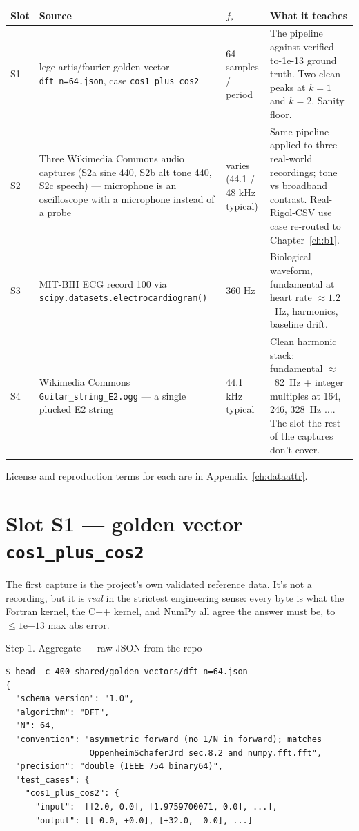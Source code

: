 \documentclass[11pt,a4paper,openany]{book}
\begin{document}
\begin{longtable}{p{2.2cm}p{4.0cm}p{2.0cm}p{6.0cm}}
\toprule
\textbf{Slot} & \textbf{Source} & \textbf{$f_s$} & \textbf{What it teaches} \\
\midrule
\endhead
S1 & lege-artis/fourier golden vector \texttt{dft\_n=64.json}, case \texttt{cos1\_plus\_cos2} & 64 samples / period & The pipeline against verified-to-1e-13 ground truth. Two clean peaks at $k=1$ and $k=2$. Sanity floor. \\
S2 & Three Wikimedia Commons audio captures (S2a sine 440, S2b alt tone 440, S2c speech) --- microphone is an oscilloscope with a microphone instead of a probe & varies (44.1 / 48 kHz typical) & Same pipeline applied to three real-world recordings; tone vs broadband contrast. Real-Rigol-CSV use case re-routed to Chapter~\ref{ch:b1}. \\
S3 & MIT-BIH ECG record 100 via \texttt{scipy.datasets.electrocardiogram()} \cite{Moody2001,Goldberger2000} & 360 Hz & Biological waveform, fundamental at heart rate $\approx 1.2$~Hz, harmonics, baseline drift. \\
S4 & Wikimedia Commons \texttt{Guitar\_string\_E2.ogg} --- a single plucked E2 string & 44.1 kHz typical & Clean harmonic stack: fundamental $\approx$~82~Hz + integer multiples at 164, 246, 328~Hz $\ldots$. The slot the rest of the captures don't cover. \\
\bottomrule
\end{longtable}

License and reproduction terms for each are in
Appendix~\ref{ch:dataattr}.

\clearpage
\section{Slot S1 --- golden vector \texttt{cos1\_plus\_cos2}}
\label{sec:s1}

The first capture is the project's own validated reference data. It's
not a recording, but it is \emph{real} in the strictest engineering
sense: every byte is what the Fortran kernel, the C++ kernel, and
NumPy all agree the answer must be, to $\leq 1\mathrm{e}{-13}$ max
abs error.

\begin{pipelinestep}{Step 1. Aggregate --- raw JSON from the repo}
\begin{lstlisting}[style=shaddata]
$ head -c 400 shared/golden-vectors/dft_n=64.json
{
  "schema_version": "1.0",
  "algorithm": "DFT",
  "N": 64,
  "convention": "asymmetric forward (no 1/N in forward); matches
                 OppenheimSchafer3rd sec.8.2 and numpy.fft.fft",
  "precision": "double (IEEE 754 binary64)",
  "test_cases": {
    "cos1_plus_cos2": {
      "input":  [[2.0, 0.0], [1.9759700071, 0.0], ...],
      "output": [[-0.0, +0.0], [+32.0, -0.0], ...]
\end{lstlisting}
\end{pipelinestep}
\end{document}
